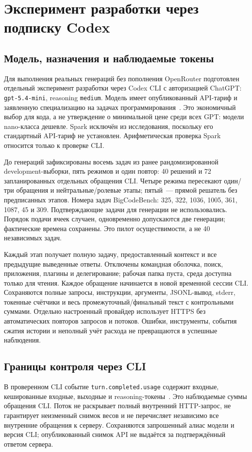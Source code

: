 \section{Эксперимент разработки через подписку Codex}\label{sec:codexpilot}

\subsection{Модель, назначения и наблюдаемые токены}
Для выполнения реальных генераций без пополнения OpenRouter подготовлен отдельный эксперимент разработки через Codex CLI с авторизацией ChatGPT: \texttt{gpt-5.4-mini}, reasoning \texttt{medium}. Модель имеет опубликованный API-тариф и заявленную специализацию на задачах программирования~\cite{openai54mini2026,openaipricing2026}. Это экономичный выбор для кода, а не утверждение о минимальной цене среди всех GPT: модели nano-класса дешевле. Spark исключён из исследования, поскольку его стандартный API-тариф не установлен. Арифметическая проверка Spark относится только к проверке CLI.

До генераций зафиксированы восемь задач из ранее рандомизированной development-выборки, пять режимов и один повтор: 40 решений и 72 запланированных отдельных обращения CLI. Четыре режима пересекают один/три обращения и нейтральные/ролевые этапы; пятый~--- прямой решатель без предписанных этапов. Номера задач BigCodeBench: 325, 322, 1036, 1005, 361, 1087, 45 и 309. Подтверждающие задачи для генерации не использовались. Порядок подачи ячеек случаен, одновременно допускаются две генерации; фактические времена сохранены. Это пилот осуществимости, а не 40 независимых задач.

Каждый этап получает полную задачу, предоставленный контекст и все предыдущие выведенные ответы. Отключены командная оболочка, поиск, приложения, плагины и делегирование; рабочая папка пуста, среда доступна только для чтения. Каждое обращение начинается в новой временной сессии CLI. Сохраняются полные запросы, инструкции, аргументы, JSONL-вывод, stderr, токенные счётчики и весь промежуточный/финальный текст с контрольными суммами. Отдельно настроенный провайдер использует HTTPS без автоматических повторов запросов и потоков. Ошибки, инструменты, события сжатия истории и неполный учёт расхода не превращаются в успешные наблюдения.

\subsection{Границы контроля через CLI}
В проверенном CLI событие \texttt{turn.completed.usage} содержит входные, кешированные входные, выходные и reasoning-токены~\cite{codexexec2026}. Это наблюдаемые суммы обращения CLI. Поток не раскрывает полный внутренний HTTP-запрос, не гарантирует неизменный снимок весов и не перечисляет независимо все внутренние обращения к серверу. Сохраняются запрошенный алиас модели и версия CLI; опубликованный снимок API не выдаётся за подтверждённый ответом сервера.

